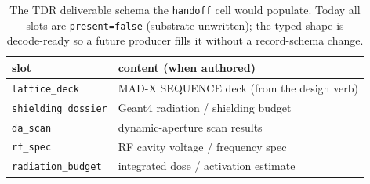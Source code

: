 \begin{table}[h]
\centering
\small
\begin{tabular}{@{}l l@{}}
\toprule
slot & content (when authored) \\
\midrule
\texttt{lattice\_deck}      & MAD-X SEQUENCE deck (from the design verb) \\
\texttt{shielding\_dossier} & Geant4 radiation / shielding budget \\
\texttt{da\_scan}           & dynamic-aperture scan results \\
\texttt{rf\_spec}           & RF cavity voltage / frequency spec \\
\texttt{radiation\_budget}  & integrated dose / activation estimate \\
\bottomrule
\end{tabular}
\caption{The TDR deliverable schema the \texttt{handoff} cell would
populate. Today all slots are \texttt{present=false} (substrate
unwritten); the typed shape is decode-ready so a future producer fills it
without a record-schema change.}
\label{tab:app-tdr}
\end{table}
